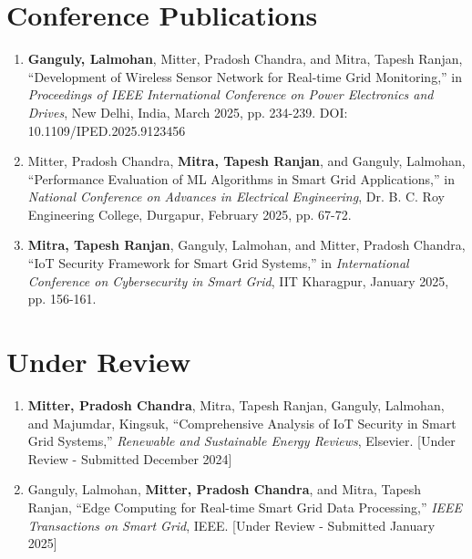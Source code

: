 \section*{Conference Publications}
\begin{enumerate}
\item \textbf{Ganguly, Lalmohan}, Mitter, Pradosh Chandra, and Mitra, Tapesh Ranjan, ``Development of Wireless Sensor Network for Real-time Grid Monitoring,'' in \textit{Proceedings of IEEE International Conference on Power Electronics and Drives}, New Delhi, India, March 2025, pp. 234-239. DOI: 10.1109/IPED.2025.9123456

\item Mitter, Pradosh Chandra, \textbf{Mitra, Tapesh Ranjan}, and Ganguly, Lalmohan, ``Performance Evaluation of ML Algorithms in Smart Grid Applications,'' in \textit{National Conference on Advances in Electrical Engineering}, Dr. B. C. Roy Engineering College, Durgapur, February 2025, pp. 67-72.

\item \textbf{Mitra, Tapesh Ranjan}, Ganguly, Lalmohan, and Mitter, Pradosh Chandra, ``IoT Security Framework for Smart Grid Systems,'' in \textit{International Conference on Cybersecurity in Smart Grid}, IIT Kharagpur, January 2025, pp. 156-161.
\end{enumerate}

\section*{Under Review}
\begin{enumerate}
\item \textbf{Mitter, Pradosh Chandra}, Mitra, Tapesh Ranjan, Ganguly, Lalmohan, and Majumdar, Kingsuk, ``Comprehensive Analysis of IoT Security in Smart Grid Systems,'' \textit{Renewable and Sustainable Energy Reviews}, Elsevier. [Under Review - Submitted December 2024]

\item Ganguly, Lalmohan, \textbf{Mitter, Pradosh Chandra}, and Mitra, Tapesh Ranjan, ``Edge Computing for Real-time Smart Grid Data Processing,'' \textit{IEEE Transactions on Smart Grid}, IEEE. [Under Review - Submitted January 2025]
\end{enumerate}

\cleardoublepage